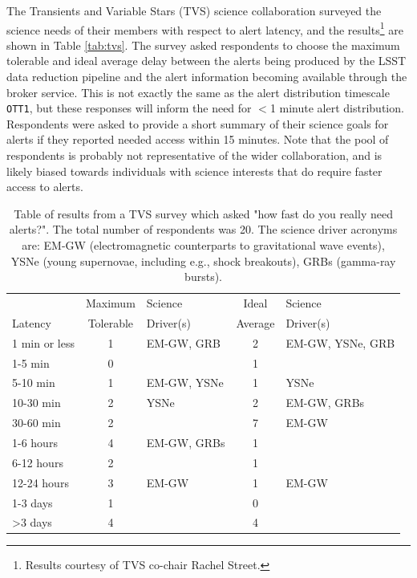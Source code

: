 \documentclass[DM,lsstdraft,authoryear,toc]{lsstdoc}
\begin{document}
The Transients and Variable Stars (TVS) science collaboration surveyed the science needs of their members with respect to alert latency, and the results\footnote{Results courtesy of TVS co-chair Rachel Street.} are shown in Table \ref{tab:tvs}.
The survey asked respondents to choose the maximum tolerable and ideal average delay between the alerts being produced by the LSST data reduction pipeline and the alert information becoming available through the broker service.
This is not exactly the same as the alert distribution timescale {\tt OTT1}, but these responses will inform the need for $<$1 minute alert distribution.
Respondents were asked to provide a short summary of their science goals for alerts if they reported needed access within 15 minutes.
Note that the pool of respondents is probably not representative of the wider collaboration, and is likely biased towards individuals with science interests that do require faster access to alerts. 

\begin{table}[h]%
\caption{Table of results from a TVS survey which asked "how fast do you really need alerts?". The total number of respondents was 20. The science driver acronyms are: EM-GW (electromagnetic counterparts to gravitational wave events), YSNe (young supernovae, including e.g., shock breakouts), GRBs (gamma-ray bursts). \label{tab:tvs}}
\begin{center}
\begin{tabular}{|l|cl|cl|}
\hline
             & Maximum & Science & Ideal       & Science \\
Latency & Tolerable  & Driver(s) &  Average & Driver(s) \\
\hline
1 min or less & 1 & EM-GW, GRB  & 2 & EM-GW, YSNe, GRB \\
1-5 min         & 0 &                          & 1 &                                   \\
5-10 min       & 1 & EM-GW, YSNe & 1 & YSNe \\
10-30 min     & 2 & YSNe               & 2 & EM-GW, GRBs \\
30-60 min     & 2 &                          & 7 & EM-GW  \\
1-6 hours     & 4 & EM-GW, GRBs & 1 &  \\
6-12 hours   & 2 &                          & 1 &  \\
12-24 hours & 3 & EM-GW            & 1 & EM-GW \\
1-3 days      & 1 &                           & 0 &  \\
>3 days       & 4 &                           & 4 &  \\
\hline
\end{tabular}
\end{center}
\label{default}
\end{table}%
\end{document}
